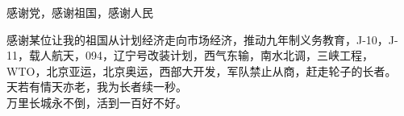 \begin{acknowledge}
  感谢党，感谢祖国，感谢人民

  感谢某位让我的祖国从计划经济走向市场经济，推动九年制义务教育，J-10，J-11，载人航天，094，辽宁号改装计划，西气东输，南水北调，三峡工程，WTO，北京亚运，北京奥运，西部大开发，军队禁止从商，赶走轮子的长者。\\

  天若有情天亦老，我为长者续一秒。\\
  
  万里长城永不倒，活到一百好不好。\\

  
  
    
\end{acknowledge}